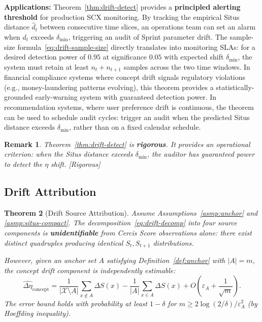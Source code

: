 \documentclass[12pt,a4paper]{article}
\newtheorem{theorem}{Theorem}[section]
\newtheorem{remark}[theorem]{Remark}
\newcommand{\rigorous}{\textcolor{green!50!black}{\small\textsf{[Rigorous]}}}
\newcommand{\cX}{\mathcal{X}}
\begin{document}
\medskip\noindent
\textbf{Applications:}
Theorem~\ref{thm:drift-detect} provides a \textbf{principled alerting
threshold} for production SCX monitoring.  By tracking the empirical Situs
distance $\widehat{d}_t$ between consecutive time slices, an operations team
can set an alarm when $d_t$ exceeds $\delta_{\min}$, triggering an audit of
Sprint parameter drift.  The sample-size formula~\eqref{eq:drift-sample-size}
directly translates into monitoring SLAs: for a desired detection power of
$0.95$ at significance $0.05$ with expected shift $\delta_{\min}$, the system
must retain at least $n_t+n_{t+1}$ samples across the two time windows.
In financial compliance systems where concept drift signals regulatory
violations (e.g., money-laundering patterns evolving), this theorem provides
a statistically-grounded early-warning system with guaranteed detection
power.  In recommendation systems, where user preference drift is continuous,
the theorem can be used to schedule audit cycles: trigger an audit when the
predicted Situs distance exceeds $\delta_{\min}$, rather than on a fixed
calendar schedule.

\begin{remark}
Theorem~\ref{thm:drift-detect} is \textbf{rigorous}.  It provides an
operational criterion: when the Situs distance exceeds $\delta_{\min}$,
the auditor has guaranteed power to detect the $\eta$ shift.  \rigorous
\end{remark}

\subsection{Drift Attribution}
\label{sec:drift-attr}

\begin{theorem}[Drift Source Attribution]
\label{thm:drift-attr}
Assume Assumptions~\ref{asmp:anchor} and \ref{asmp:situs-compact}.  The
decomposition~\eqref{eq:drift-decomp} into four source components is
\textbf{unidentifiable} from Cercis Score observations alone: there exist
distinct quadruples producing identical $S_t, S_{t+1}$ distributions.

However, given an anchor set $A$ satisfying Definition~\ref{def:anchor}
with $|A| = m$, the concept drift component is independently estimable:
\begin{equation}\label{eq:concept-estimate}
    \widehat{\Delta\eta}_{\mathrm{concept}} =
    \frac{1}{|\cX \setminus A|}\sum_{x \notin A} \Delta S(x) -
    \frac{1}{|A|}\sum_{x \in A} \Delta S(x) +
    O\!\left(\varepsilon_A + \frac{1}{\sqrt{m}}\right).
\end{equation}
The error bound holds with probability at least $1 - \delta$ for
$m \ge 2\log(2/\delta)/\varepsilon_A^2$ (by Hoeffding inequality).
\end{theorem}
\end{document}
